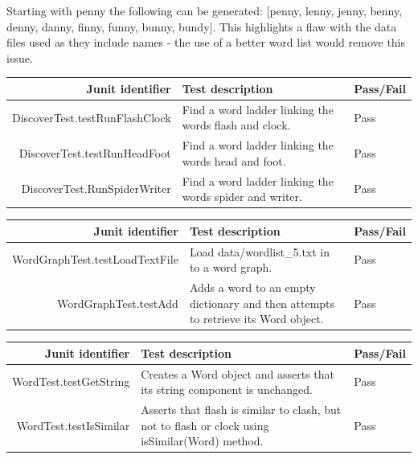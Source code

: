 \documentclass[11pt]{article} %
\begin{document}
Starting with penny the following can be generated: [penny, lenny, jenny, benny, denny, danny, finny, funny, bunny, bundy]. This highlights a flaw with the data files used as they include names - the use of a better word list would remove this issue.

\begin{table}[h!!]
\begin{tabularx}{\linewidth}{| r | X | l |}
\hline
Junit identifier & Test description & Pass/Fail\\
\hline
DiscoverTest.testRunFlashClock & Find a word ladder linking the words flash and clock. & Pass\\
DiscoverTest.testRunHeadFoot & Find a word ladder linking the words head and foot. & Pass\\
DiscoverTest.RunSpiderWriter & Find a word ladder linking the words spider and writer. & Pass\\
\hline
\end{tabularx}
\end{table}

\begin{table}[h!!]
\begin{tabularx}{\linewidth}{| r | X | l |}
\hline
Junit identifier & Test description & Pass/Fail\\
\hline
WordGraphTest.testLoadTextFile & Load data/wordlist\_{}5.txt in to a word graph. & Pass \\
WordGraphTest.testAdd & Adds a word to an empty dictionary and then attempts to retrieve its Word object. & Pass\\
\hline
\end{tabularx}
\end{table}

\begin{table}[h!!]
\begin{tabularx}{\linewidth}{| r | X | l |}
\hline
Junit identifier & Test description & Pass/Fail\\
\hline
WordTest.testGetString & Creates a Word object and asserts that its string component is unchanged. & Pass\\
WordTest.testIsSimilar & Asserts that flash is similar to clash, but not to flash or clock using isSimilar(Word) method. & Pass\\
\hline
\end{tabularx}
\end{table}
\end{document}
